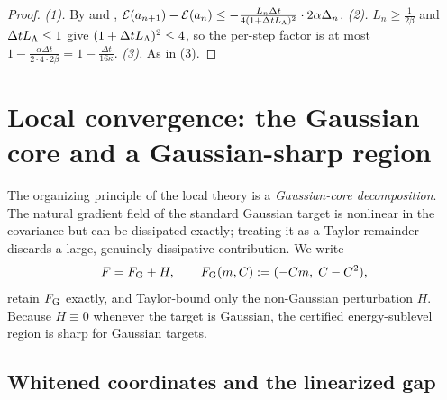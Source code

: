 \begin{proof}
\emph{(1).} By  and ,
$\mathcal{E}(a_{n+1})-\mathcal{E}(a_n)\leq-\tfrac{L_n\Delta t}{4(1+\Delta tL_\Lambda)^2}\cdot2\alpha\Delta_n$.
\emph{(2).} $L_n\geq\tfrac1{2\beta}$ and $\Delta tL_\Lambda\leq1$ give $(1+\Delta tL_\Lambda)^2\leq4$, so the
per-step factor is at most $1-\tfrac{\alpha\Delta t}{2\cdot4\cdot2\beta}=1-\tfrac{\Delta t}{16\kappa}$.
\emph{(3).} As in (3).
\end{proof}

\section{Local convergence: the Gaussian core and a Gaussian-sharp region}
\label{sec:local}

The organizing principle of the local theory is a \emph{Gaussian-core decomposition}. The natural
gradient field of the standard Gaussian target is nonlinear in the covariance but can be dissipated
exactly; treating it as a Taylor remainder discards a large, genuinely dissipative contribution. We
write
\[
    F=F_{\mathrm G}+H,
    \qquad
    F_{\mathrm G}(m,C):=(-Cm,\;C-C^2),
\]
retain $F_{\mathrm G}$ exactly, and Taylor-bound only the non-Gaussian perturbation $H$. Because
$H\equiv0$ whenever the target is Gaussian, the certified energy-sublevel region is sharp for
Gaussian targets.

\subsection{Whitened coordinates and the linearized gap}
\label{subsec:whitened}

